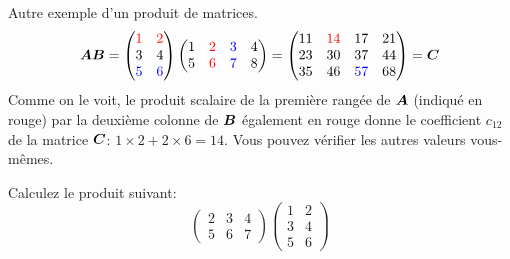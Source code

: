 \begin{exemple} 
Autre exemple d'un produit de matrices.
	\[
		\boldsymbol{A}\boldsymbol{B} =
	\begin{pmatrix}
	\textcolor{red}{1} & \textcolor{red}{2} \\
	3 & 4 \\
	\textcolor{blue}{5} & \textcolor{blue}{6}
	\end{pmatrix}
	\begin{pmatrix}
	1 & \textcolor{red}{2} & \textcolor{blue}{3} & 4 \\
	5 & \textcolor{red}{6} & \textcolor{blue}{7} & 8
	\end{pmatrix}
	=
	\begin{pmatrix}
	11 & \textcolor{red}{14} & 17 & 21 \\
	23 & 30 & 37 &44 \\
	35 & 46 & \textcolor{blue}{57} & 68
	\end{pmatrix} = \boldsymbol{C}
\]
	Comme on le voit, le produit scalaire de la première rangée de $\boldsymbol{A}$ (indiqué en rouge) par la deuxième colonne de $\boldsymbol{B}$ également en rouge donne
	le coefficient $c_{12}$ de la matrice $\boldsymbol{C}$: $1\times 2 + 2\times 6 = 14$.  Vous pouvez vérifier les autres valeurs vous-mêmes.
\end{exemple}

\begin{exerciceB}
Calculez le produit suivant:
\[
\begin{pmatrix}
2 & 3 & 4 \\
5 & 6 & 7
\end{pmatrix}
\begin{pmatrix}
1 & 2 \\
3 & 4 \\
5 & 6
\end{pmatrix}
\]
\end{exerciceB}


